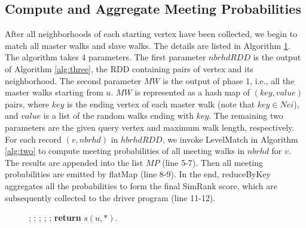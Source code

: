 \documentclass[conference]{IEEEtran}
\theoremstyle{definition}
\theoremstyle{definition}
\begin{document}
\subsection{Compute and Aggregate Meeting Probabilities}
After all neighborhoods of each starting vertex have been collected, we begin to match all master walks and slave walks. 
The details are listed in Algorithm \ref{alg:four}.
The algorithm takes 4 parameters.
The first parameter $nbrhdRDD$ is the output of Algorithm \ref{alg:three}, the RDD containing pairs of vertex and its neighborhood.
The second parameter $MW$ is the output of phase 1, i.e., all the master walks starting from $u$.
$MW$ is represented as a  hash map of $(key, value)$ pairs, where $key$ is the ending vertex of each master walk (note that $key \in Nei$), and $value$ is a list of the random walks ending with $key$.
The remaining two parameters are the given query vertex and maximum walk length, respectively.
For each record $(v, nbrhd)$ in $hbrhdRDD$, we invoke LevelMatch in Algorithm \ref{alg:two} to compute meeting probabilities of all meeting walks in  $nbrhd$ for $v$. 
The results are appended into the list $MP$ (line 5-7).
Then all meeting probabilities are emitted by {\asciifamily flatMap} (line 8-9).
In the end,  {\asciifamily reduceByKey} aggregates all the probabilities to form the final SimRank score, which are subsequently collected to the driver program (line 11-12).

\begin{figure}[!t]
\begin{algorithm}[H]
\label{alg:four}
\begin{algorithmic}[1]
	;
	;
	;
	;
	\State {\qquad $\})$}
	;
	\State \textbf{return} $s(u, *)$.
\EndProcedure
\end{algorithmic}
\end{algorithm}
\end{figure}
\end{document}
